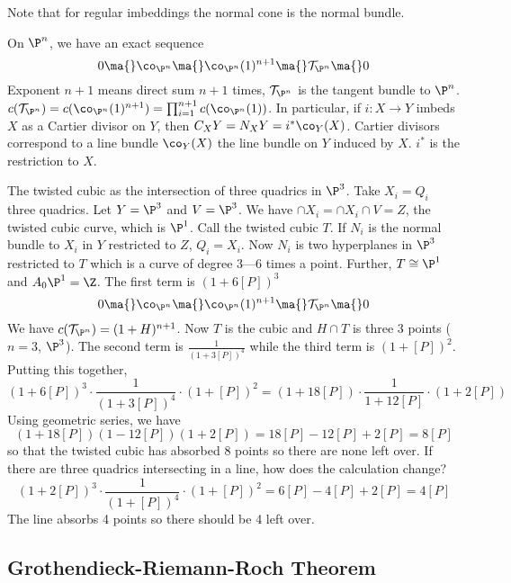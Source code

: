 Note that for regular imbeddings the normal cone is the normal bundle. 

\begin{ex}
On $\P^n$, we have an exact sequence
	\[
	0 \ma{} \co_{\P^n} \ma{} \co_{\P^n}(1)^{n+1} \ma{} \mathcal{T}_{\P^n} \ma{} 0
	\]
Exponent $n+1$ means direct sum $n+1$ times, $\mathcal{T}_{\P^n}$ is the tangent bundle to $\P^n$. $c(\mathcal{T}_{\P^n})=c(\co_{\P^n}(1)^{n+1})=\prod_{i=1}^{n+1}c(\co_{\P^n}(1))$. In particular, if $i: X \to Y$ imbeds $X$ as a Cartier divisor on $Y$, then $C_XY = N_X Y=i^*\co_Y(X)$. Cartier divisors correspond to a line bundle $\co_Y(X)$ the line bundle on $Y$ induced by $X$. $i^*$ is the restriction to $X$.
\end{ex}

\begin{ex}
The twisted cubic as the intersection of three quadrics in $\P^3$. Take $X_i=Q_i$ three quadrics. Let $Y=\P^3$ and $V=\P^3$. We have $\cap X_i= \cap X_i \cap V= Z$, the twisted cubic curve, which is $\P^1$. Call the twisted cubic $T$. If $N_i$ is the normal bundle to $X_i$ in $Y$ restricted to $Z$, $Q_i=X_i$. Now $N_i$ is two hyperplanes in $\P^3$ restricted to $T$ which is a curve of degree 3---6 times a point. Further, $T \cong \P^1$ and $A_0\P^1=\Z$. The first term is $(1+6[P])^3$
	\[
	0 \ma{} \co_{\P^n} \ma{} \co_{\P^n}(1)^{n+1} \ma{} \mathcal{T}_{\P^n} \ma{} 0
	\]
We have $c(\mathcal{T}_{\P^n})=(1+H)^{n+1}$. Now $T$ is the cubic and $H \cap T$ is three 3 points ($n=3$, $\P^3$). The second term is $\frac{1}{(1+3[P])^4}$ while the third term is $(1+[P])^2$. Putting this together, 
	\[
	(1+6[P])^3 \cdot \dfrac{1}{(1+3[P])^4} \cdot (1+[P])^2= (1+18[P]) \cdot \dfrac{1}{1+12[P]} \cdot (1+2[P])
	\]
Using geometric series, we have
	\[
	(1+18[P])(1-12[P])(1+2[P])=18[P]-12[P]+2[P]=8[P]
	\]
so that the twisted cubic has absorbed 8 points so there are none left over. If there are three quadrics intersecting in a line, how does the calculation change?
	\[
	(1+2[P])^3 \cdot \dfrac{1}{(1+[P])^4} \cdot (1+[P])^2=6[P] - 4[P] + 2[P] = 4[P]
	\]
The line absorbs 4 points so there should be 4 left over. 
\end{ex}



\subsection{Grothendieck-Riemann-Roch Theorem}


